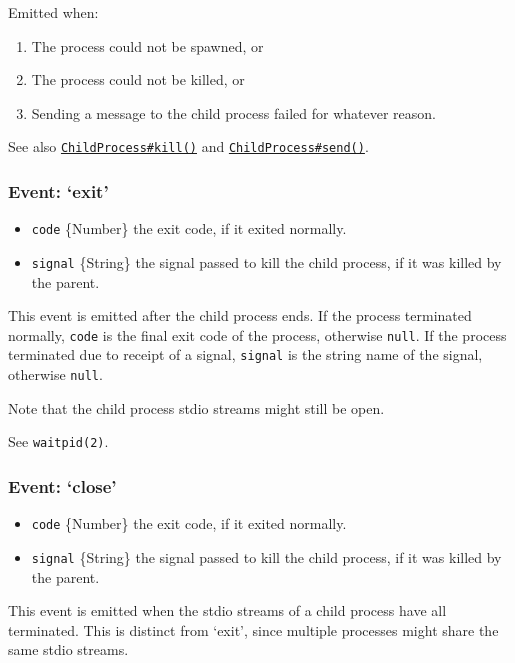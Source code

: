 Emitted when:

\begin{enumerate}
\item
  The process could not be spawned, or
\item
  The process could not be killed, or
\item
  Sending a message to the child process failed for whatever reason.
\end{enumerate}

See also
\hyperref[child_process_child_kill_signal]{\texttt{ChildProcess\#kill()}}
and
\hyperref[child_process_child_send_message_sendhandle]{\texttt{ChildProcess\#send()}}.

\subsubsection{Event: `exit'}

\begin{itemize}
\item
  \texttt{code} \{Number\} the exit code, if it exited normally.
\item
  \texttt{signal} \{String\} the signal passed to kill the child
  process, if it was killed by the parent.
\end{itemize}

This event is emitted after the child process ends. If the process
terminated normally, \texttt{code} is the final exit code of the
process, otherwise \texttt{null}. If the process terminated due to
receipt of a signal, \texttt{signal} is the string name of the signal,
otherwise \texttt{null}.

Note that the child process stdio streams might still be open.

See \texttt{waitpid(2)}.

\subsubsection{Event: `close'}

\begin{itemize}
\item
  \texttt{code} \{Number\} the exit code, if it exited normally.
\item
  \texttt{signal} \{String\} the signal passed to kill the child
  process, if it was killed by the parent.
\end{itemize}

This event is emitted when the stdio streams of a child process have all
terminated. This is distinct from `exit', since multiple processes might
share the same stdio streams.

